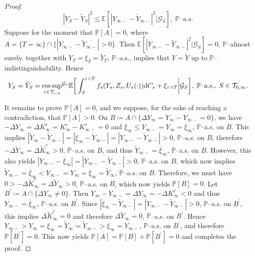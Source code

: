 \documentclass[10pt]{article} %
\newcommand\cG{\mathcal G}
\newcommand\cT{\mathcal T}
\newcommand{\smalltext}[1]{\text{\fontsize{4}{4}\selectfont$#1$}}
\def \E{\mathbb{E}}
\def \P{\mathbb{P}}
\newcommand{\1}{\mathbf{1}}
\def\d{\mathrm{d}}
\DeclareMathOperator*{\esssup}{ess\,sup}
\begin{document}
\begin{proof}
	\begin{equation*}
		|Y_S - \tilde Y_S|^2 \leq \E[|Y_{\infty-} - \tilde Y_{\infty-}|^2|\cG_S], \; \text{$\P$--a.s.}
	\end{equation*}
	Suppose for the moment that $\P[A] = 0$, where $A = \{T = \infty\} \cap \{|Y_{\infty-}-\tilde Y_{\infty-}| > 0\}$. Then $\E[|Y_{\infty-} - \tilde Y_{\infty-}|^2|\cG_S] = 0$, $\P$--almost surely.  together with $Y_T = \xi_T = \tilde Y_T$, $\P$--a.s., implies that $Y = \tilde Y$ up to $\P$--indistinguishability. Hence
	\begin{equation*}
		Y_S = \tilde Y_S = {\esssup_{\tau \in \cT_{\smalltext{S}\smalltext{,}\smalltext{\infty}}}}^{\cG_\smalltext{S}} \E\bigg[ \int_S^{\tau \land T} f_s(Y_s,Z_s,U_s(\cdot)) \d C_s + \xi_{\tau \land T} \bigg| \cG_S\bigg], \;\text{$\P$--a.s.}, \; S \in \cT_{0,\infty}.
	\end{equation*}
	
	\medskip
	It remains to prove $\P[A] = 0$, and we suppose, for the sake of reaching a contradiction, that $\P[A] > 0$. On $B \coloneqq A \cap \{\Delta Y_\infty = Y_\infty - Y_{\infty-} = 0\}$, we have $-\Delta Y_\infty = \Delta K^r_\infty = K^r_\infty - K^r_{\infty-} = 0$ and $\overline\xi_\infty \leq Y_{\infty-} = Y_\infty = \xi_\infty$, $\P$--a.s. on $B$. This implies $|\tilde Y_\infty - \tilde Y_{\infty-}| = |\xi_\infty - \tilde Y_{\infty-}| = |Y_{\infty-} - \tilde Y_{\infty-}| > 0$, $\P$--a.s. on $B$, therefore $-\Delta \tilde Y_\infty = \Delta\tilde K^r_\infty > 0$, $\P$--a.s. on $B$, and thus $\tilde Y_{\infty-} = \overline\xi_\infty$, $\P$--a.s. on $B$. However, this also yields $|Y_{\infty-} - \overline\xi_\infty| = |Y_{\infty-} - \tilde Y_{\infty-}| > 0$, $\P$--a.s. on $B$, which now implies $\tilde Y_{\infty-} = \overline\xi_\infty < Y_{\infty-} = Y_\infty = \xi_\infty = \tilde Y_\infty$, $\P$--a.s. on $B$. Therefore, we must have $0 > -\Delta\tilde K^r_\infty = \Delta\tilde Y_\infty > 0$, $\P$--a.s. on $B$, which now yields $\P[B] = 0$. Let $B^\prime \coloneqq A \cap \{\Delta Y_\infty \neq 0\}$. Then $Y_{\infty} - Y_{\infty-} = \Delta Y_\infty = -\Delta K^r_\infty < 0$ and thus $Y_{\infty-} = \overline\xi_\infty$, $\P$--a.s. on $B^\prime$. Since $|\overline\xi_\infty - \tilde Y_{\infty-}| = |Y_{\infty-} - \tilde Y_{\infty-}| > 0$, $\P$--a.s. on $B^\prime$, this implies $\Delta \tilde K^r_\infty = 0$ and therefore $\Delta\tilde Y_\infty = 0$, $\P$--a.s. on $B^\prime$. Hence $Y_{\infty-} > Y_\infty = \xi_\infty = \tilde Y_{\infty} = \tilde Y_{\infty-} > \overline \xi_\infty = Y_{\infty-}$, $\P$--a.s. on $B^\prime$, and therefore $\P[B^\prime] = 0$. This now yields $\P[A] = \P[B] + \P[B^\prime] = 0$ and completes the proof.
\end{proof}
\end{document}
